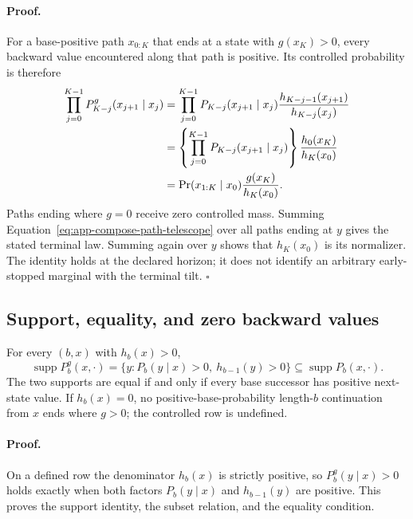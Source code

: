 \paragraph{Proof.}
For a base-positive path $x_{0:K}$ that ends at a state with $g(x_K)>0$,
every backward value encountered along that path is positive.  Its controlled
probability is therefore
\begin{align}
  \prod_{j=0}^{K-1}
  P_{K-j}^g(x_{j+1}\mid x_j)
  &=
  \prod_{j=0}^{K-1}
  P_{K-j}(x_{j+1}\mid x_j)
  \frac{h_{K-j-1}(x_{j+1})}{h_{K-j}(x_j)}
  \notag\\
  &=
  \left\{
  \prod_{j=0}^{K-1}
  P_{K-j}(x_{j+1}\mid x_j)
  \right\}
  \frac{h_0(x_K)}{h_K(x_0)}
  \notag\\
  &=
  \Pr(x_{1:K}\mid x_0)
  \frac{g(x_K)}{h_K(x_0)}.
  \label{eq:app-compose-path-telescope}
\end{align}
Paths ending where $g=0$ receive zero controlled mass.  Summing
Equation~\eqref{eq:app-compose-path-telescope} over all paths ending at $y$
gives the stated terminal law.  Summing again over $y$ shows that
$h_K(x_0)$ is its normalizer.  The identity holds at the declared horizon;
it does not identify an arbitrary early-stopped marginal with the terminal
tilt.
\hfill$\square$

\subsection{Support, equality, and zero backward values}
\label{sec:app-compose-support-proof}

\begin{composeappendixproposition}
\label{prop:app-compose-support}
For every $(b,x)$ with $h_b(x)>0$,
\[
  \operatorname{supp}P_b^g(x,\cdot)
  =
  \{y:P_b(y\mid x)>0,\ h_{b-1}(y)>0\}
  \subseteq
  \operatorname{supp}P_b(x,\cdot).
\]
The two supports are equal if and only if every base successor has positive
next-state value.  If $h_b(x)=0$, no positive-base-probability length-$b$
continuation from $x$ ends where $g>0$; the controlled row is undefined.
\end{composeappendixproposition}

\paragraph{Proof.}
On a defined row the denominator $h_b(x)$ is strictly positive, so
$P_b^g(y\mid x)>0$ holds exactly when both factors
$P_b(y\mid x)$ and $h_{b-1}(y)$ are positive.  This proves the support
identity, the subset relation, and the equality condition.

